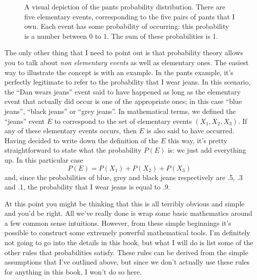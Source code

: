 \documentclass[
  letterpaper,
  DIV=11,
  numbers=noendperiod]{scrreprt}
\begin{document}
\begin{figure}


\caption{\label{fig-4pantsprob}A visual depiction of the pants
probability distribution. There are five elementary events,
corresponding to the five pairs of pants that I own. Each event has some
probability of occurring: this probability is a number between 0 to 1.
The sum of these probabilities is 1.}

\end{figure}%

The only other thing that I need to point out is that probability theory
allows you to talk about \emph{non elementary events} as well as
elementary ones. The easiest way to illustrate the concept is with an
example. In the pants example, it's perfectly legitimate to refer to the
probability that I wear jeans. In this scenario, the ``Dan wears jeans''
event said to have happened as long as the elementary event that
actually did occur is one of the appropriate ones; in this case ``blue
jeans'', ``black jeans'' or ``grey jeans''. In mathematical terms, we
defined the ``jeans'' event \(E\) to correspond to the set of elementary
events \((X_1, X_2, X_3)\). If any of these elementary events occurs,
then \(E\) is also said to have occurred. Having decided to write down
the definition of the \(E\) this way, it's pretty straightforward to
state what the probability \(P(E)\) is: we just add everything up. In
this particular case \[P(E) = P(X_1) + P(X_2) + P(X_3)\] and, since the
probabilities of blue, grey and black jeans respectively are .5, .3 and
.1, the probability that I wear jeans is equal to .9.

At this point you might be thinking that this is all terribly obvious
and simple and you'd be right. All we've really done is wrap some basic
mathematics around a few common sense intuitions. However, from these
simple beginnings it's possible to construct some extremely powerful
mathematical tools. I'm definitely not going to go into the details in
this book, but what I will do is list some of the other rules that
probabilities satisfy. These rules can be derived from the simple
assumptions that I've outlined above, but since we don't actually use
these rules for anything in this book, I won't do so here.
\end{document}
